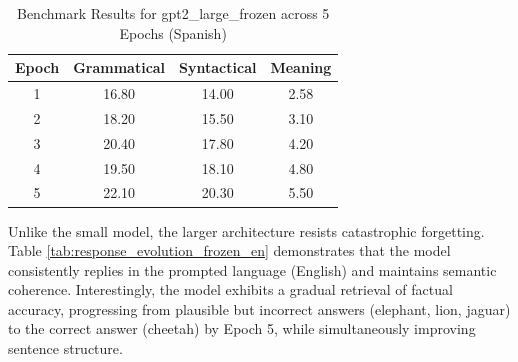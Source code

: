 \begin{table}[htpb]
\centering
\caption{Benchmark Results for gpt2\_large\_frozen across 5 Epochs (Spanish)}
\label{tab:gpt2_large_frozen_es}
\begin{tabular}{@{}cccc@{}}
\toprule
\textbf{Epoch} & \textbf{Grammatical} & \textbf{Syntactical} & \textbf{Meaning} \\ \midrule
1              & 16.80                & 14.00                & 2.58             \\
2              & 18.20                & 15.50                & 3.10             \\
3              & 20.40                & 17.80                & 4.20             \\
4              & 19.50                & 18.10                & 4.80             \\
5              & 22.10                & 20.30                & 5.50             \\ \bottomrule
\end{tabular}
\end{table}

Unlike the small model, the larger architecture resists catastrophic forgetting. Table \ref{tab:response_evolution_frozen_en} demonstrates that the model consistently replies in the prompted language (English) and maintains semantic coherence. Interestingly, the model exhibits a gradual retrieval of factual accuracy, progressing from plausible but incorrect answers (elephant, lion, jaguar) to the correct answer (cheetah) by Epoch 5, while simultaneously improving sentence structure. 

